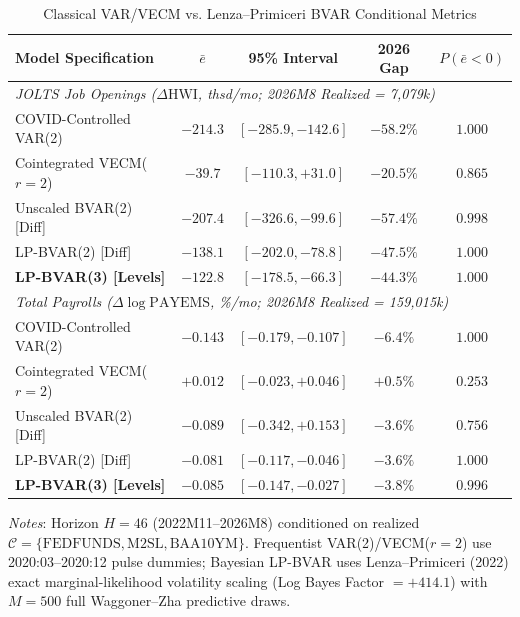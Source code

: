 \begin{table}[t]
\centering
\caption{Classical VAR/VECM vs. Lenza--Primiceri BVAR Conditional Metrics}
\label{tab:bvar_comparison}
\begin{minipage}{\columnwidth}
\centering
\fontsize{6.4pt}{7.8pt}\selectfont
\setlength{\tabcolsep}{1.6pt}
\begin{tabular}{lcccc}
\toprule
\textbf{Model Specification} & $\bar{e}$ & \textbf{95\% Interval} & \textbf{2026 Gap} & $P(\bar{e}<0)$ \\
\midrule
\multicolumn{5}{l}{\textit{JOLTS Job Openings ($\Delta\text{HWI}$, thsd/mo; 2026M8 Realized = 7,079k)}} \\
COVID-Controlled VAR(2) & $-214.3$ & $[-285.9, -142.6]$ & $-58.2\%$ & $1.000$ \\
Cointegrated VECM($r=2$) & $-39.7$ & $[-110.3, +31.0]$ & $-20.5\%$ & $0.865$ \\
Unscaled BVAR(2) [Diff] & $-207.4$ & $[-326.6, -99.6]$ & $-57.4\%$ & $0.998$ \\
LP-BVAR(2) [Diff]       & $-138.1$ & $[-202.0, -78.8]$ & $-47.5\%$ & $1.000$ \\
\textbf{LP-BVAR(3) [Levels]} & $\mathbf{-122.8}$ & $\mathbf{[-178.5, -66.3]}$ & $\mathbf{-44.3\%}$ & $\mathbf{1.000}$ \\
\midrule
\multicolumn{5}{l}{\textit{Total Payrolls ($\Delta\log\text{PAYEMS}$, \%/mo; 2026M8 Realized = 159,015k)}} \\
COVID-Controlled VAR(2) & $-0.143$ & $[-0.179, -0.107]$ & $-6.4\%$ & $1.000$ \\
Cointegrated VECM($r=2$) & $+0.012$ & $[-0.023, +0.046]$ & $+0.5\%$ & $0.253$ \\
Unscaled BVAR(2) [Diff] & $-0.089$ & $[-0.342, +0.153]$ & $-3.6\%$ & $0.756$ \\
LP-BVAR(2) [Diff]       & $-0.081$ & $[-0.117, -0.046]$ & $-3.6\%$ & $1.000$ \\
\textbf{LP-BVAR(3) [Levels]} & $\mathbf{-0.085}$ & $\mathbf{[-0.147, -0.027]}$ & $\mathbf{-3.8\%}$ & $\mathbf{0.996}$ \\
\bottomrule
\end{tabular}
\vskip 2pt
{\scriptsize \textit{Notes}: Horizon $H=46$ (2022M11--2026M8) conditioned on realized $\mathcal{C}=\{\text{FEDFUNDS},\text{M2SL},\text{BAA10YM}\}$. Frequentist VAR(2)/VECM($r=2$) use 2020:03--2020:12 pulse dummies; Bayesian LP-BVAR uses Lenza--Primiceri (2022) exact marginal-likelihood volatility scaling (Log Bayes Factor $= +414.1$) with $M=500$ full Waggoner--Zha predictive draws.\par}
\end{minipage}
\end{table}
